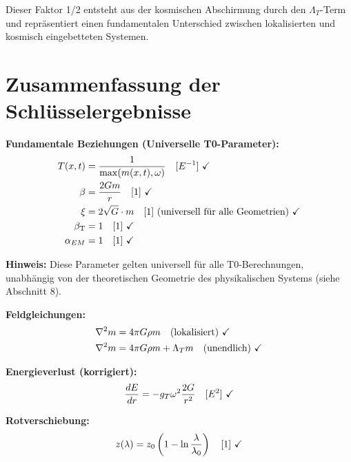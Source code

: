 \documentclass[12pt,a4paper]{article}
\newcommand{\betaT}{\beta_{\text{T}}}
\begin{document}
	Dieser Faktor 1/2 entsteht aus der kosmischen Abschirmung durch den $\Lambda_T$-Term und repräsentiert einen fundamentalen Unterschied zwischen lokalisierten und kosmisch eingebetteten Systemen.
	
	\section{Zusammenfassung der Schlüsselergebnisse}
	\label{sec:key_results}
	
	\begin{tcolorbox}[colback=green!5!white,colframe=green!75!black,title=T0-Modellparameter (Alle dimensional konsistent)]
		
		\textbf{Fundamentale Beziehungen (Universelle T0-Parameter):}
		\begin{align}
			T(x,t) &= \frac{1}{\max(m(x,t), \omega)} \quad [E^{-1}] \text{ \checkmark} \\
			\beta &= \frac{2Gm}{r} \quad [1] \text{ \checkmark} \\
			\xi &= 2\sqrt{G} \cdot m \quad [1] \text{ (universell für alle Geometrien)} \text{ \checkmark} \\
			\betaT &= 1 \quad [1] \text{ \checkmark} \\
			\alpha_{EM} &= 1 \quad [1] \text{ \checkmark}
		\end{align}
		
		\textbf{Hinweis:} Diese Parameter gelten universell für alle T0-Berechnungen, unabhängig von der theoretischen Geometrie des physikalischen Systems (siehe Abschnitt 8).
		
		
		\textbf{Feldgleichungen:}
		\begin{align}
			\nabla^2 m &= 4\pi G \rho m \quad \text{(lokalisiert)} \text{ \checkmark} \\
			\nabla^2 m &= 4\pi G \rho m + \Lambda_T m \quad \text{(unendlich)} \text{ \checkmark}
		\end{align}
		
		\textbf{Energieverlust (korrigiert):}
		\begin{equation}
			\frac{dE}{dr} = -g_T \omega^2 \frac{2G}{r^2} \quad [E^2] \text{ \checkmark}
		\end{equation}
		
		\textbf{Rotverschiebung:}
		\begin{equation}
			z(\lambda) = z_0\left(1 - \ln\frac{\lambda}{\lambda_0}\right) \quad [1] \text{ \checkmark}
		\end{equation}
		
	\end{tcolorbox}
	
\end{document}
